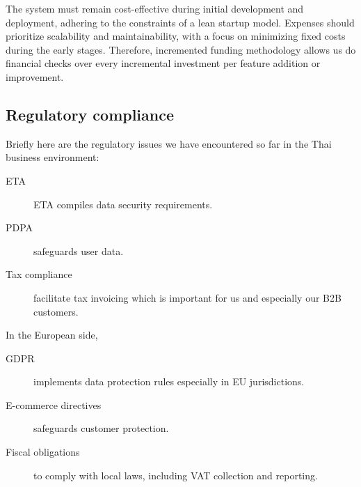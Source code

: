  The system must remain cost-effective during initial development and deployment, adhering to the constraints of a lean startup model. Expenses should prioritize scalability and maintainability, with a focus on minimizing fixed costs during the early stages. Therefore, incremented funding methodology allows us do financial checks over every incremental investment per feature addition or improvement.

\subsection{Regulatory compliance}

Briefly here are the regulatory issues we have encountered so far in the Thai business environment:

\begin{description}
	\item[ETA] ETA compiles data security requirements.
	\item[PDPA] safeguards user data.
	\item[Tax compliance] facilitate tax invoicing which is important for us and especially our B2B customers.
\end{description}

In the European side,

\begin{description}
	\item[GDPR] implements data protection rules especially in EU jurisdictions.
	\item[E-commerce directives] safeguards customer protection.
	\item[Fiscal obligations] to comply with local laws, including VAT collection and reporting.
\end{description}

\clearpage